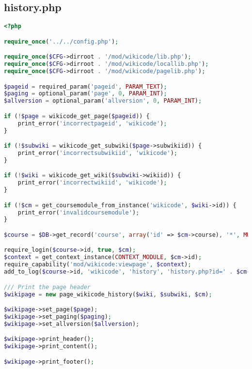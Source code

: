 \subsection{history.php}
\begin{lstlisting}[language=PHP]
<?php

require_once('../../config.php');

require_once($CFG->dirroot . '/mod/wikicode/lib.php');
require_once($CFG->dirroot . '/mod/wikicode/locallib.php');
require_once($CFG->dirroot . '/mod/wikicode/pagelib.php');

$pageid = required_param('pageid', PARAM_TEXT);
$paging = optional_param('page', 0, PARAM_INT);
$allversion = optional_param('allversion', 0, PARAM_INT);

if (!$page = wikicode_get_page($pageid)) {
    print_error('incorrectpageid', 'wikicode');
}

if (!$subwiki = wikicode_get_subwiki($page->subwikiid)) {
    print_error('incorrectsubwikiid', 'wikicode');
}

if (!$wiki = wikicode_get_wiki($subwiki->wikiid)) {
    print_error('incorrectwikiid', 'wikicode');
}

if (!$cm = get_coursemodule_from_instance('wikicode', $wiki->id)) {
    print_error('invalidcoursemodule');
}

$course = $DB->get_record('course', array('id' => $cm->course), '*', MUST_EXIST);

require_login($course->id, true, $cm);
$context = get_context_instance(CONTEXT_MODULE, $cm->id);
require_capability('mod/wikicode:viewpage', $context);
add_to_log($course->id, 'wikicode', 'history', 'history.php?id=' . $cm->id, $wiki->id);

/// Print the page header
$wikipage = new page_wikicode_history($wiki, $subwiki, $cm);

$wikipage->set_page($page);
$wikipage->set_paging($paging);
$wikipage->set_allversion($allversion);

$wikipage->print_header();
$wikipage->print_content();

$wikipage->print_footer();
\end{lstlisting}

